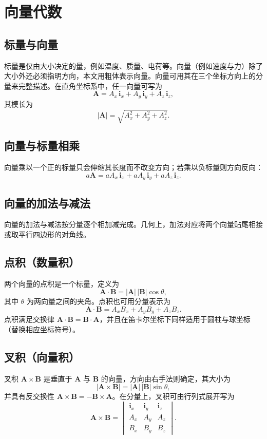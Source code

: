 \section{向量代数}

\subsection{标量与向量}
标量是仅由大小决定的量，例如温度、质量、电荷等。向量（例如速度与力）除了大小外还必须指明方向，本文用粗体表示向量。向量可用其在三个坐标方向上的分量来完整描述。在直角坐标系中，任一向量可写为
\[
\mathbf{A}=A_x\,\mathbf{i}_x+A_y\,\mathbf{i}_y+A_z\,\mathbf{i}_z,
\]
其模长为
\[
|\mathbf{A}|=\sqrt{A_x^2+A_y^2+A_z^2}.
\]

\subsection{向量与标量相乘}
向量乘以一个正的标量只会伸缩其长度而不改变方向；若乘以负标量则方向反向：
\[
a\mathbf{A}=aA_x\,\mathbf{i}_x+aA_y\,\mathbf{i}_y+aA_z\,\mathbf{i}_z.
\]

\subsection{向量的加法与减法}
向量的加法与减法按分量逐个相加减完成。几何上，加法对应将两个向量贴尾相接或取平行四边形的对角线。

\subsection{点积（数量积）}
两个向量的点积是一个标量，定义为
\[
\mathbf{A}\cdot\mathbf{B}=|\mathbf{A}|\,|\mathbf{B}|\cos\theta,
\]
其中 $\theta$ 为两向量之间的夹角。点积也可用分量表示为
\[
\mathbf{A}\cdot\mathbf{B}=A_xB_x+A_yB_y+A_zB_z.
\]
点积满足交换律 $\mathbf{A}\cdot\mathbf{B}=\mathbf{B}\cdot\mathbf{A}$，并且在笛卡尔坐标下同样适用于圆柱与球坐标（替换相应坐标符号）。

\subsection{叉积（向量积）}
叉积 $\mathbf{A}\times\mathbf{B}$ 是垂直于 $\mathbf{A}$ 与 $\mathbf{B}$ 的向量，方向由右手法则确定，其大小为
\[
|\mathbf{A}\times\mathbf{B}|=|\mathbf{A}|\,|\mathbf{B}|\sin\theta,
\]
并具有反交换性 $\mathbf{A}\times\mathbf{B}=-\mathbf{B}\times\mathbf{A}$。在分量上，叉积可由行列式展开写为
\[
\mathbf{A}\times\mathbf{B}=\begin{vmatrix}\mathbf{i}_x & \mathbf{i}_y & \mathbf{i}_z \\
A_x & A_y & A_z \\
B_x & B_y & B_z \end{vmatrix}.
\]

